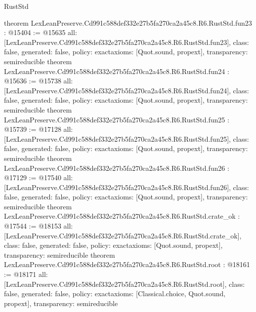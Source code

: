\begin{lexlean}{RustStd}
\begin{coremodule}
{}
theorem LexLeanPreserve.Cd991c588def332e27b5fa270ca2a45c8.R6.RustStd.fun23 : @15404 := @15635 {
  all: [LexLeanPreserve.Cd991c588def332e27b5fa270ca2a45c8.R6.RustStd.fun23],
  class: false,
  generated: false,
  policy: exact{axioms: [Quot.sound, propext]},
  transparency: semireducible
}
theorem LexLeanPreserve.Cd991c588def332e27b5fa270ca2a45c8.R6.RustStd.fun24 : @15636 := @15738 {
  all: [LexLeanPreserve.Cd991c588def332e27b5fa270ca2a45c8.R6.RustStd.fun24],
  class: false,
  generated: false,
  policy: exact{axioms: [Quot.sound, propext]},
  transparency: semireducible
}
theorem LexLeanPreserve.Cd991c588def332e27b5fa270ca2a45c8.R6.RustStd.fun25 : @15739 := @17128 {
  all: [LexLeanPreserve.Cd991c588def332e27b5fa270ca2a45c8.R6.RustStd.fun25],
  class: false,
  generated: false,
  policy: exact{axioms: [Quot.sound, propext]},
  transparency: semireducible
}
theorem LexLeanPreserve.Cd991c588def332e27b5fa270ca2a45c8.R6.RustStd.fun26 : @17129 := @17540 {
  all: [LexLeanPreserve.Cd991c588def332e27b5fa270ca2a45c8.R6.RustStd.fun26],
  class: false,
  generated: false,
  policy: exact{axioms: [Quot.sound, propext]},
  transparency: semireducible
}
theorem LexLeanPreserve.Cd991c588def332e27b5fa270ca2a45c8.R6.RustStd.crate_ok : @17544 := @18153 {
  all: [LexLeanPreserve.Cd991c588def332e27b5fa270ca2a45c8.R6.RustStd.crate_ok],
  class: false,
  generated: false,
  policy: exact{axioms: [Quot.sound, propext]},
  transparency: semireducible
}
theorem LexLeanPreserve.Cd991c588def332e27b5fa270ca2a45c8.R6.RustStd.root : @18161 := @18171 {
  all: [LexLeanPreserve.Cd991c588def332e27b5fa270ca2a45c8.R6.RustStd.root],
  class: false,
  generated: false,
  policy: exact{axioms: [Classical.choice, Quot.sound, propext]},
  transparency: semireducible
}


\end{coremodule}
\end{lexlean}
